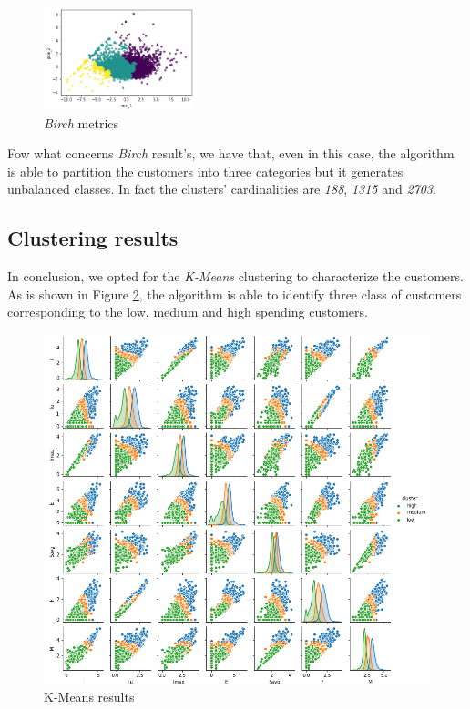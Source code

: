 \begin{figure}
	\vspace*{-1cm}
	\begin{center}
		\includegraphics[width=0.39\textwidth]{img/clustering/clust_birch.png}
	\end{center}
	\caption{\emph{Birch} metrics}
	\label{fig:clust_birch}
\end{figure}

Fow what concerns \emph{Birch} result's, we have that, even in this case, the algorithm is able to partition the customers into three categories but it generates unbalanced classes. In fact the clusters' cardinalities are \emph{188}, \emph{1315} and \emph{2703}.

\newpage

\subsection{Clustering results}

In conclusion, we opted for the \emph{K-Means} clustering to characterize the customers. As is shown in Figure \ref{fig:pairplot}, the algorithm is able to identify three class of customers corresponding to the low, medium and high spending customers.

\begin{figure}[h!]
	\captionsetup{justification=centering}
	\centering
	\includegraphics[width=\textwidth]{img/clustering/pair_plot_clust.png}
	\centering
	\caption{K-Means results}
	\label{fig:pairplot}
\end{figure}


